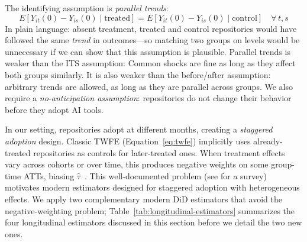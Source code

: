 The identifying assumption is \emph{parallel trends}:
\begin{equation}
\label{eq:parallel-trends}
E[Y_{it}(0) - Y_{is}(0) \mid \text{treated}] = E[Y_{it}(0) - Y_{is}(0) \mid \text{control}] \quad \forall\, t, s
\end{equation}
In plain language: absent treatment, treated and control repositories would have followed the same \emph{trend} in outcomes---so matching two groups on levels would be unnecessary if we can show that this assumption is plausible.
Parallel trends is weaker than the ITS assumption: Common shocks are fine as long as they affect both groups similarly.
It is also weaker than the before/after assumption: arbitrary trends are allowed, as long as they are parallel across groups.
We also require a \emph{no-anticipation assumption}: repositories do not change their behavior before they adopt AI tools.

In our setting, repositories adopt at different months, creating a \emph{staggered adoption} design.
Classic TWFE (Equation~\ref{eq:twfe}) implicitly uses already-treated repositories as controls for later-treated ones.
When treatment effects vary across cohorts or over time, this produces negative weights on some group-time ATTs, biasing $\hat{\tau}$~\cite{goodman2021difference, dechaisemartin2020two}.
This well-documented problem (see \citet{roth2023whats} for a survey) motivates modern estimators designed for staggered adoption with heterogeneous effects.
We apply two complementary modern DiD estimators that avoid the negative-weighting problem; Table~\ref{tab:longitudinal-estimators} summarizes the four longitudinal estimators discussed in this section before we detail the two new ones.

